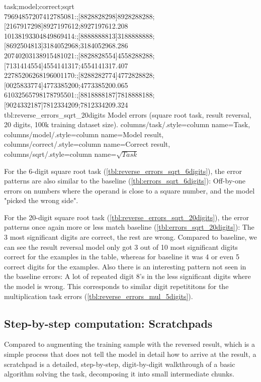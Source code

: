 {
task;model;correct;sqrt\\
79694857207412785081:;[8828828298]8928288288;[2167917298]8927197612;8927197612.208\\
10138193304849869414:;[8888888813]3188888888;[8692504813]3184052968;3184052968.286\\
20740203138915481021:;[8828828554]4558288288;[7131414554]4554141317;4554141317.407\\
22785206268196001170:;[8288282774]4772828828;[0025833774]4773385200;4773385200.065\\
61032565798178795501:;[8818888187]7818888188;[9024332187]7812334209;7812334209.324\\
}
{tbl:reverse_errors_sqrt_20digits}
{
    Model errors (square root task, result reversal, 20 digits, 100k training dataset size).
}
{
    columns/task/.style={column name={Task}},
    columns/model/.style={column name={Model result}},
    columns/correct/.style={column name={Correct result}},
    columns/sqrt/.style={column name={$\sqrt{Task}$}}
}

For the 6-digit square root task (\cref{tbl:reverse_errors_sqrt_6digits}), the error patterns are also similar to the baseline (\cref{tbl:errors_sqrt_6digits}): Off-by-one errors on numbers where the operand is close to a square number, and the model "picked the wrong side".

For the 20-digit square root task (\cref{tbl:reverse_errors_sqrt_20digits}), the error patterns once again more or less match baseline (\cref{tbl:errors_sqrt_20digits}): The 3 most significant digits are correct, the rest are wrong.
Compared to baseline, we can see the result reversal model only got 3 out of 10 most significant digits correct for the examples in the table, whereas for baseline it was 4 or even 5 correct digits for the examples.
Also there is an interesting pattern not seen in the baseline errors: A lot of repeated digit 8's in the less significant digits where the model is wrong. This corresponds to similar digit repetititons for the multiplication task errors (\cref{tbl:reverse_errors_mul_5digits}).

\subsection{Step-by-step computation: Scratchpads}
\label{scratchpad}

Compared to augmenting the training sample with the reversed result, which is a simple process that does not tell the model in detail how to arrive at the result, a scratchpad is a detailed, step-by-step, digit-by-digit walkthrough of a basic algorithm solving the task, decomposing it into small intermediate chunks.

